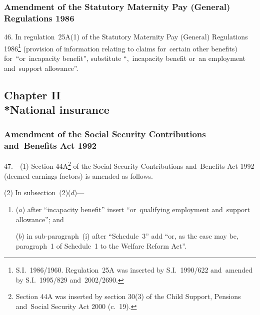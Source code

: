 \documentclass[12pt,a4paper]{article}
\begin{document}
\subsubsection[46. Amendment of the Statutory Maternity Pay (General) Regulations 1986]{Amendment of the Statutory Maternity Pay (General) Regulations 1986}

46.  In regulation~25A(1) of the Statutory Maternity Pay (General) Regulations 1986\footnote{S.I.~1986/1960. Regulation~25A was inserted by S.I.~1990/622 and~amended by S.I.~1995/829 and~2002/2690.} (provision of information relating to claims for~certain other benefits) for~“or~incapacity benefit”, substitute “,~incapacity benefit or~an employment and~support allowance”.

\subsection[Chapter II --- National insurance]{Chapter II\\*National insurance}

\renewcommand\parthead{--- Part V Chapter II}

\subsubsection[47. Amendment of the Social Security Contributions and~Benefits Act 1992]{Amendment of the Social Security Contributions and~Benefits Act 1992}

47.---(1)  Section 44A\footnote{Section 44A was inserted by section 30(3) of the Child Support, Pensions and~Social Security Act 2000 (c.~19).} of the Social Security Contributions and~Benefits Act 1992 (deemed earnings factors) is amended as follows.

(2) In subsection~(2)($d$)—
\begin{enumerate}\item[]
($a$) after “incapacity benefit” insert “or~qualifying employment and~support allowance”; and

($b$) in sub-paragraph~(i)  after “Schedule~3” add “or, as the case may be, paragraph~1 of Schedule~1 to the Welfare Reform Act”.
\end{enumerate}
\end{document}
